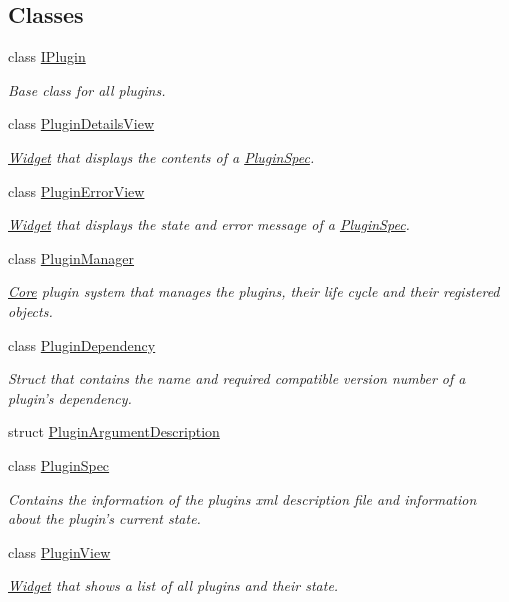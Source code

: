 \subsection*{\-Classes}
\begin{DoxyCompactItemize}
\item 
class \hyperlink{class_extension_system_1_1_i_plugin}{\-I\-Plugin}
\begin{DoxyCompactList}\small\item\em \-Base class for all plugins. \end{DoxyCompactList}\item 
class \hyperlink{class_extension_system_1_1_plugin_details_view}{\-Plugin\-Details\-View}
\begin{DoxyCompactList}\small\item\em \hyperlink{class_widget}{\-Widget} that displays the contents of a \hyperlink{class_extension_system_1_1_plugin_spec}{\-Plugin\-Spec}. \end{DoxyCompactList}\item 
class \hyperlink{class_extension_system_1_1_plugin_error_view}{\-Plugin\-Error\-View}
\begin{DoxyCompactList}\small\item\em \hyperlink{class_widget}{\-Widget} that displays the state and error message of a \hyperlink{class_extension_system_1_1_plugin_spec}{\-Plugin\-Spec}. \end{DoxyCompactList}\item 
class \hyperlink{class_extension_system_1_1_plugin_manager}{\-Plugin\-Manager}
\begin{DoxyCompactList}\small\item\em \hyperlink{namespace_core}{\-Core} plugin system that manages the plugins, their life cycle and their registered objects. \end{DoxyCompactList}\item 
class \hyperlink{struct_extension_system_1_1_plugin_dependency}{\-Plugin\-Dependency}
\begin{DoxyCompactList}\small\item\em \-Struct that contains the name and required compatible version number of a plugin's dependency. \end{DoxyCompactList}\item 
struct \hyperlink{struct_extension_system_1_1_plugin_argument_description}{\-Plugin\-Argument\-Description}
\item 
class \hyperlink{class_extension_system_1_1_plugin_spec}{\-Plugin\-Spec}
\begin{DoxyCompactList}\small\item\em \-Contains the information of the plugins xml description file and information about the plugin's current state. \end{DoxyCompactList}\item 
class \hyperlink{class_extension_system_1_1_plugin_view}{\-Plugin\-View}
\begin{DoxyCompactList}\small\item\em \hyperlink{class_widget}{\-Widget} that shows a list of all plugins and their state. \end{DoxyCompactList}\end{DoxyCompactItemize}


